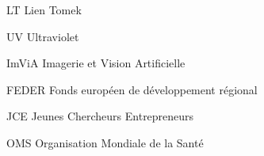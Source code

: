             {LT}
            {Lien Tomek}
            
            {UV}
            {Ultraviolet}

            {ImViA}
            {Imagerie et Vision Artificielle}
            
            {FEDER}
            {Fonds européen de développement régional}

            {JCE}
            {Jeunes Chercheurs Entrepreneurs}
  
            {OMS}
            {Organisation Mondiale de la Santé}          
            